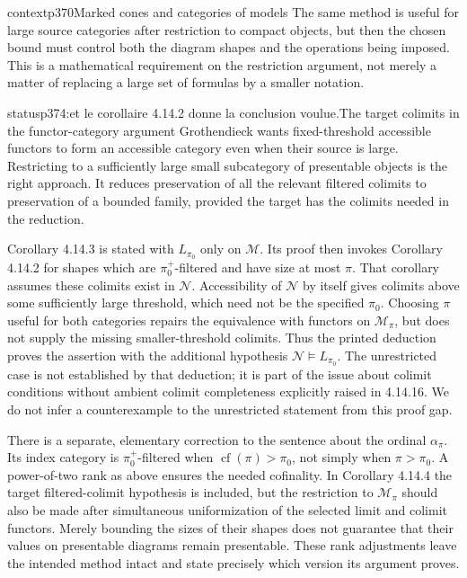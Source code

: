 \begin{dcomment}{context}{p370}{Marked cones and categories of models}
The same method is useful for large source categories after restriction to compact objects, but then the chosen bound must control both the diagram shapes and the operations being imposed. This is a mathematical requirement on the restriction argument, not merely a matter of replacing a large set of formulas by a smaller notation.
\end{dcomment}

\begin{dcomment}{status}{p374:et le corollaire 4.14.2 donne la conclusion voulue.}{The target colimits in the functor-category argument}
Grothendieck wants fixed-threshold accessible functors to form an accessible category even when their source is large. Restricting to a sufficiently large small subcategory of presentable objects is the right approach. It reduces preservation of all the relevant filtered colimits to preservation of a bounded family, provided the target has the colimits needed in the reduction.

Corollary 4.14.3 is stated with $L_{\pi_0}$ only on $\mathcal M$. Its proof then invokes Corollary 4.14.2 for shapes which are $\pi_0^+$-filtered and have size at most $\pi$. That corollary assumes these colimits exist in $\mathcal N$. Accessibility of $\mathcal N$ by itself gives colimits above some sufficiently large threshold, which need not be the specified $\pi_0$. Choosing $\pi$ useful for both categories repairs the equivalence with functors on $\mathcal M_\pi$, but does not supply the missing smaller-threshold colimits. Thus the printed deduction proves the assertion with the additional hypothesis $\mathcal N\models L_{\pi_0}$. The unrestricted case is not established by that deduction; it is part of the issue about colimit conditions without ambient colimit completeness explicitly raised in 4.14.16. We do not infer a counterexample to the unrestricted statement from this proof gap.

There is a separate, elementary correction to the sentence about the ordinal $\alpha_\pi$. Its index category is $\pi_0^+$-filtered when $\operatorname{cf}(\pi)>\pi_0$, not simply when $\pi>\pi_0$. A power-of-two rank as above ensures the needed cofinality. In Corollary 4.14.4 the target filtered-colimit hypothesis is included, but the restriction to $\mathcal M_\pi$ should also be made after simultaneous uniformization of the selected limit and colimit functors. Merely bounding the sizes of their shapes does not guarantee that their values on presentable diagrams remain presentable. These rank adjustments leave the intended method intact and state precisely which version its argument proves.
\end{dcomment}

